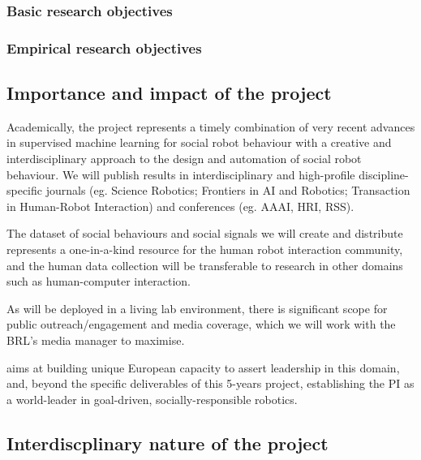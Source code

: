 \subsubsection{Basic research objectives}

\subsubsection{Empirical research objectives}


\subsection{Importance and impact of the project}

\begin{rewrite}

Academically, the \project project represents a timely combination of
very recent advances in supervised machine learning for social robot
behaviour with a creative and interdisciplinary approach to the design
and automation of social robot behaviour. 
We will publish \project results in interdisciplinary and high-profile
discipline-specific journals (eg. Science Robotics; Frontiers in AI and
Robotics; Transaction in Human-Robot Interaction) and conferences (eg. AAAI,
HRI, RSS).

The dataset of social behaviours and social signals we will create and
distribute represents a one-in-a-kind resource for the human robot
interaction community, and the human data collection will be
transferable to research in other domains such as human-computer
interaction.

As \project will be deployed in a living lab environment, there is
significant scope for public outreach/engagement and media coverage,
which we will work with the BRL's media manager to maximise.


\project aims at building unique European capacity to assert leadership in this
domain, and, beyond the specific deliverables of this 5-years project,
establishing the PI as a world-leader in goal-driven, socially-responsible
robotics.

\end{rewrite}

\subsection{Interdiscplinary nature of the project}

